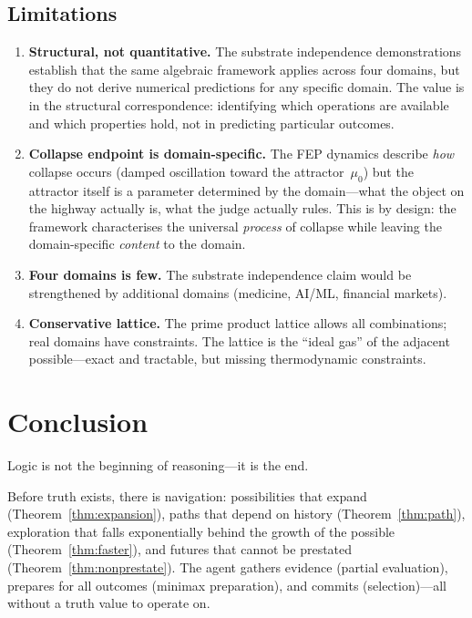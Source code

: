 \documentclass[11pt,a4paper]{article}
\begin{document}
\subsection{Limitations}

\begin{enumerate}[nosep]
\item \textbf{Structural, not quantitative.} The substrate independence
  demonstrations establish that the same algebraic framework applies
  across four domains, but they do not derive numerical predictions for
  any specific domain. The value is in the structural correspondence:
  identifying which operations are available and which properties hold,
  not in predicting particular outcomes.
\item \textbf{Collapse endpoint is domain-specific.} The FEP dynamics
  describe \emph{how} collapse occurs (damped oscillation toward the
  attractor~$\mu_0$) but the attractor itself is a parameter determined
  by the domain---what the object on the highway actually is, what the
  judge actually rules. This is by design: the framework characterises
  the universal \emph{process} of collapse while leaving the
  domain-specific \emph{content} to the domain.
\item \textbf{Four domains is few.} The substrate independence claim
  would be strengthened by additional domains (medicine, AI/ML,
  financial markets).
\item \textbf{Conservative lattice.} The prime product lattice allows
  all combinations; real domains have constraints. The lattice is the
  ``ideal gas'' of the adjacent possible---exact and tractable, but
  missing thermodynamic constraints.
\end{enumerate}

\section{Conclusion}
\label{sec:conclusion}

Logic is not the beginning of reasoning---it is the end.

Before truth exists, there is navigation: possibilities that expand
(Theorem~\ref{thm:expansion}), paths that depend on history
(Theorem~\ref{thm:path}), exploration that falls exponentially behind
the growth of the possible (Theorem~\ref{thm:faster}), and futures
that cannot be prestated (Theorem~\ref{thm:nonprestate}). The agent
gathers evidence (partial evaluation), prepares for all outcomes
(minimax preparation), and commits (selection)---all without a truth value
to operate on.
\end{document}
